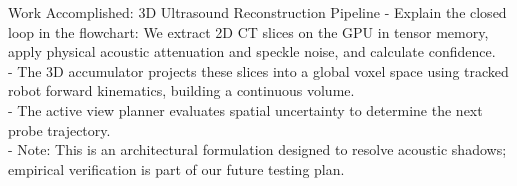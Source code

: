 \documentclass{if-beamer}
\begin{document}
\begin{frame}{Work Accomplished: 3D Ultrasound Reconstruction Pipeline}
{        - Explain the closed loop in the flowchart: We extract 2D CT slices on the GPU in tensor memory, apply physical acoustic attenuation and speckle noise, and calculate confidence.\\
        - The 3D accumulator projects these slices into a global voxel space using tracked robot forward kinematics, building a continuous volume.\\
        - The active view planner evaluates spatial uncertainty to determine the next probe trajectory.\\
        - Note: This is an architectural formulation designed to resolve acoustic shadows; empirical verification is part of our future testing plan.
    }
\end{frame}

\end{document}

